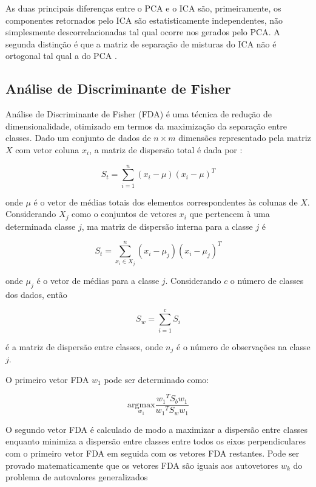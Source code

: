 As duas principais diferenças entre o PCA e o ICA são, primeiramente, os componentes retornados pelo ICA são estatisticamente independentes, não simplesmente descorrelacionadas tal qual ocorre nos gerados pelo PCA. A segunda distinção é que a matriz  de separação de misturas do ICA não é ortogonal tal qual a do PCA \cite{cao2003comparison}.

\subsection{Análise de Discriminante de Fisher}

Análise de Discriminante de Fisher (FDA) é uma técnica de redução de dimensionalidade, otimizado em termos da maximização da separação entre classes. Dado um conjunto de dados de $n \times m$ dimensões representado pela matriz $X$ com vetor coluna $x_i$, a matriz de dispersão total é dada por \cite{CHIANG20041389}:

\begin{equation}
    S_t=\sum_{i=1}^{n}(x_i - \mu)(x_i - \mu)^T
\end{equation}

\noindent onde $\mu$ é o vetor de médias totais dos elementos correspondentes às colunas de $X$. Considerando $X_j$ como o conjuntos de vetores $x_i$ que pertencem à uma determinada classe $j$, ma matriz de dispersão interna para a classe $j$ é

\begin{equation}
    S_t=\sum_{x_i\in X_j}^{n}(x_i - \mu_{j})(x_i - \mu_{j})^T
\end{equation}

\noindent onde $\mu_{j}$ é o vetor de médias para a classe $j$. Considerando $c$ o número de classes dos dados, então

\begin{equation}
    S_w=\sum_{i=1}^{c}S_i
\end{equation}

\noindent é a matriz de dispersão entre classes, onde $n_j$ é o número de observações na classe $j$.

O primeiro vetor FDA $w_1$ pode ser determinado como:

\begin{equation}
    \underset{w_1}{\textrm{argmax}} \frac{{w_1}^TS_bw_1}{{w_1}^TS_ww_1}
\end{equation}

O segundo vetor FDA é calculado de modo a maximizar a dispersão entre classes enquanto minimiza a dispersão entre classes entre todos os eixos perpendiculares com o primeiro vetor FDA em seguida com os vetores FDA restantes. Pode ser provado matematicamente que os vetores FDA são iguais aos autovetores $w_k$ do problema de autovalores generalizados


